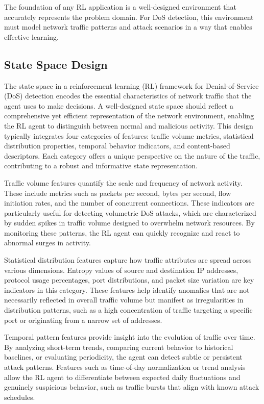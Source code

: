 \documentclass[12pt]{report}
\begin{document}
The foundation of any RL application is a well-designed environment that accurately represents the problem domain. For DoS detection, this environment must model network traffic patterns and attack scenarios in a way that enables effective learning.

\subsection{State Space Design}

The state space in a reinforcement learning (RL) framework for Denial-of-Service (DoS) detection encodes the essential characteristics of network traffic that the agent uses to make decisions. A well-designed state space should reflect a comprehensive yet efficient representation of the network environment, enabling the RL agent to distinguish between normal and malicious activity. This design typically integrates four categories of features: traffic volume metrics, statistical distribution properties, temporal behavior indicators, and content-based descriptors. Each category offers a unique perspective on the nature of the traffic, contributing to a robust and informative state representation.

Traffic volume features quantify the scale and frequency of network activity. These include metrics such as packets per second, bytes per second, flow initiation rates, and the number of concurrent connections. These indicators are particularly useful for detecting volumetric DoS attacks, which are characterized by sudden spikes in traffic volume designed to overwhelm network resources. By monitoring these patterns, the RL agent can quickly recognize and react to abnormal surges in activity.

Statistical distribution features capture how traffic attributes are spread across various dimensions. Entropy values of source and destination IP addresses, protocol usage percentages, port distributions, and packet size variation are key indicators in this category. These features help identify anomalies that are not necessarily reflected in overall traffic volume but manifest as irregularities in distribution patterns, such as a high concentration of traffic targeting a specific port or originating from a narrow set of addresses.

Temporal pattern features provide insight into the evolution of traffic over time. By analyzing short-term trends, comparing current behavior to historical baselines, or evaluating periodicity, the agent can detect subtle or persistent attack patterns. Features such as time-of-day normalization or trend analysis allow the RL agent to differentiate between expected daily fluctuations and genuinely suspicious behavior, such as traffic bursts that align with known attack schedules.
\end{document}
